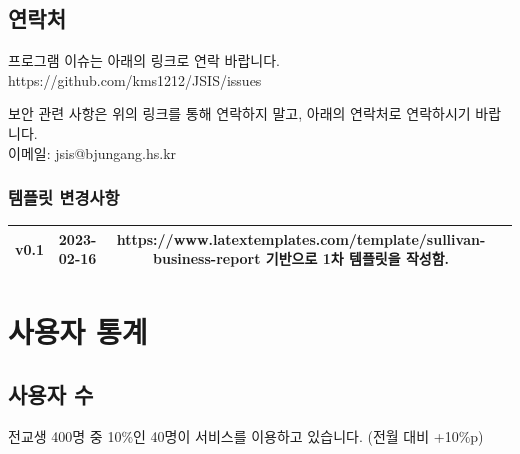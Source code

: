 \documentclass[12pt]{article}
\begin{document}
\subsection*{연락처}

프로그램 이슈는 아래의 링크로 연락 바랍니다. \\
https://github.com/kms1212/JSIS/issues

보안 관련 사항은 위의 링크를 통해 연락하지 말고, 아래의 연락처로 연락하시기 바랍니다. \\
이메일: jsis@bjungang.hs.kr

\vfill %

\subsubsection*{템플릿 변경사항}

\scriptsize %

\begin{tabular}{cccc} %
	\toprule
	v0.1 & 2023-02-16 & https://www.latextemplates.com/template/sullivan-business-report 기반으로 1차 템플릿을 작성함. \\
	\bottomrule
\end{tabular}

\newpage



\renewcommand\contentsname{목차}
\tableofcontents{}
\clearpage




\section{사용자 통계}


\subsection{사용자 수}
전교생 400명 중 10\%인 40명이 서비스를 이용하고 있습니다. (전월 대비 +10\%p)
\end{document}
